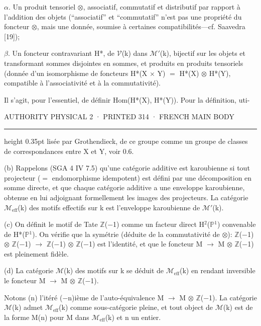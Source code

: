 \documentclass[10pt,twoside]{article}
\newcommand{\PageUnit}[3]{%
  \par\noindent\hypertarget{record-#1}{}%
  \pdfbookmark[1]{Authority page #1 · printed #2}{bookmark-#1}%
  {\sffamily\footnotesize\color{D030Muted}AUTHORITY PHYSICAL #1 · PRINTED #2 · #3}%
  \par\vspace{0.35em}\hrule height 0.35pt\vspace{0.8em}}
\begin{document}
\ensuremath{α}. Un produit tensoriel \ensuremath{⊗}, associatif, commutatif et distributif par rapport à l’addition des objets (“associatif” et “commutatif” n’est pas une propriété du foncteur \ensuremath{⊗}, mais une donnée, soumise à certaines compatibilités—cf. Saavedra [19]);\par
\ensuremath{β}. Un foncteur contravariant H*, de \ensuremath{𝒱}(k) dans \ensuremath{ℳ}\ensuremath{′}(k), bijectif sur les objets et transformant sommes disjointes en sommes, et produits en produits tensoriels (donnée d’un isomorphisme de foncteurs H*(X \ensuremath{×} Y) \ensuremath{=} H*(X) \ensuremath{⊗} H*(Y), compatible à l’associativité et à la commutativité).\par
Il s’agit, pour l’essentiel, de définir Hom(H*(X), H*(Y)). Pour la définition, uti-\par
\clearpage
\PageUnit{2}{314}{FRENCH MAIN BODY}
lisée par Grothendieck, de ce groupe comme un groupe de classes de correspondances entre X et Y, voir 0.6.\par
(b) Rappelons (SGA 4 IV 7.5) qu’une catégorie additive est karoubienne si tout projecteur (\ensuremath{=} endomorphisme idempotent) est défini par une décomposition en somme directe, et que chaque catégorie additive a une enveloppe karoubienne, obtenue en lui adjoignant formellement les images des projecteurs. La catégorie \ensuremath{ℳ}\ensuremath{_{\mathrm{eff}}}(k) des motifs effectifs sur k est l’enveloppe karoubienne de \ensuremath{ℳ}\ensuremath{′}(k).\par
(c) On définit le motif de Tate \ensuremath{ℤ}(\ensuremath{−}1) comme un facteur direct H\ensuremath{^{2}}(\ensuremath{ℙ}\ensuremath{^{1}}) convenable de H*(\ensuremath{ℙ}\ensuremath{^{1}}). On vérifie que la symétrie (déduite de la commutativité de \ensuremath{⊗}): \ensuremath{ℤ}(\ensuremath{−}1) \ensuremath{⊗} \ensuremath{ℤ}(\ensuremath{−}1) \ensuremath{→} \ensuremath{ℤ}(\ensuremath{−}1) \ensuremath{⊗} \ensuremath{ℤ}(\ensuremath{−}1) est l’identité, et que le foncteur M \ensuremath{→} M \ensuremath{⊗} \ensuremath{ℤ}(\ensuremath{−}1) est pleinement fidèle.\par
(d) La catégorie \ensuremath{ℳ}(k) des motifs sur k se déduit de \ensuremath{ℳ}\ensuremath{_{\mathrm{eff}}}(k) en rendant inversible le foncteur M \ensuremath{→} M \ensuremath{⊗} \ensuremath{ℤ}(\ensuremath{−}1).\par
Notons (n) l’itéré (\ensuremath{−}n)ième de l’auto-équivalence M \ensuremath{→} M \ensuremath{⊗} \ensuremath{ℤ}(\ensuremath{−}1). La catégorie \ensuremath{ℳ}(k) admet \ensuremath{ℳ}\ensuremath{_{\mathrm{eff}}}(k) comme sous-catégorie pleine, et tout object de \ensuremath{ℳ}(k) est de la forme M(n) pour M dans \ensuremath{ℳ}\ensuremath{_{\mathrm{eff}}}(k) et n un entier.\par
\end{document}
